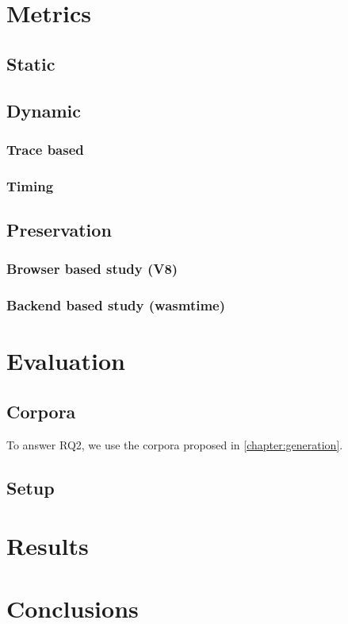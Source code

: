 \section{Metrics}

\subsection{Static}

\subsection{Dynamic}
	\subsubsection{Trace based}
	\subsubsection{Timing}

\subsection{Preservation}
\subsubsection{Browser based study (V8)}
\subsubsection{Backend based study (wasmtime)}

\section{Evaluation}

\subsection{Corpora}
To answer RQ2, we use the corpora proposed in \autoref{chapter:generation}.

\subsection{Setup}

\section{Results}

\section{Conclusions}


